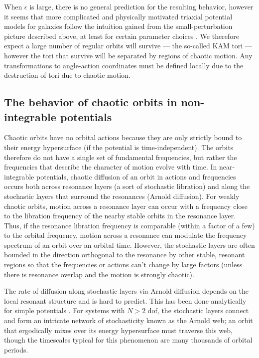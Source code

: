 \documentclass[letterpaper,12pt,preprint]{aastex}
\begin{document}
When $\epsilon$ is large, there is no general prediction for the resulting behavior, however it seems that more complicated and physically motivated triaxial potential models for galaxies follow the intuition gained from the small-perturbation picture described above, at least for certain parameter choices \citep[e.g.,][]{valluri98, merritt99}. We therefore expect a large number of regular orbits will survive --- the so-called KAM tori --- however the tori that survive will be separated by regions of chaotic motion. Any transformations to angle-action coordinates must be defined locally due to the destruction of tori due to chaotic motion. 

\subsection{The behavior of chaotic orbits in non-integrable potentials}\label{sec:behavior-chaotic}

Chaotic orbits have no orbital actions because they are only strictly bound to their energy hypersurface (if the potential is time-independent). The orbits therefore do not have a single set of fundamental frequencies, but rather the frequencies that describe the character of motion evolve with time. In near-integrable potentials, chaotic diffusion of an orbit in actions and frequencies occurs both across resonance layers (a sort of stochastic libration) and along the stochastic layers that surround the resonances (Arnold diffusion). For weakly chaotic orbits, motion across a resonance layer can occur with a frequency close to the libration frequency of the nearby stable orbits in the resonance layer. Thus, if the resonance libration frequency is comparable (within a factor of a few) to the orbital frequency, motion across a resonance can modulate the frequency spectrum of an orbit over an orbital time. However, the stochastic layers are often bounded in the direction orthogonal to the resonance by other stable, resonant regions so that the frequencies or actions can't change by large factors (unless there is resonance overlap and the motion is strongly chaotic). 

The rate of diffusion along stochastic layers via Arnold diffusion depends on the local resonant structure and is hard to predict. This has been done analytically for simple potentials \citep[e.g.,][]{chirikov??}. For systems with $N>2$ dof, the stochastic layers connect and form an intricate network of stochasticity known as the Arnold web; an orbit that ergodically mixes over its energy hypersurface must traverse this web, though the timescales typical for this phenomenon are many thousands of orbital periods. 
\end{document}
